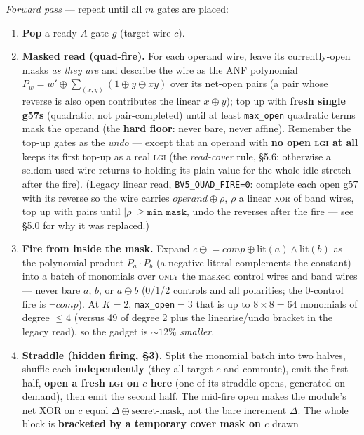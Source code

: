 \documentclass[11pt]{article}
\newcommand{\g}{\textsf{g57}}
\newcommand{\doc}[1]{\texttt{#1}}
\newcommand{\xor}{\oplus}
\newcommand{\lgi}{\textsc{lgi}}
\begin{document}
\emph{Forward pass} --- repeat until all $m$ gates are placed:
\begin{enumerate}
\item \textbf{Pop} a ready $A$-gate $g$ (target wire $c$).
\item \textbf{Masked read (quad-fire).} For each operand wire, leave its
  currently-open masks \emph{as they are} and describe the wire as the ANF
  polynomial $P_w = w' \xor \sum_{(x,y)} (1 \xor y \xor xy)$ over its net-open pairs
  (a pair whose reverse is also open contributes the linear $x \xor y$); top up with
  \textbf{fresh single \g s} (quadratic, not pair-completed) until at least
  \doc{max\_open} quadratic terms mask the operand (the \textbf{hard floor}: never
  bare, never affine). Remember the top-up gates as the \emph{undo} --- except that
  an operand with \textbf{no open \lgi{} at all} keeps its first top-up as a real
  \lgi{} (the \emph{read-cover} rule, \S5.6: otherwise a seldom-used wire returns to
  holding its plain value for the whole idle stretch after the fire). (Legacy linear
  read, \doc{BV5\_QUAD\_FIRE=0}: complete each open \g{} with its reverse so the wire
  carries $\mathit{operand} \xor \rho$, $\rho$ a linear \textsc{xor} of band wires,
  top up with pairs until $|\rho| \ge \doc{min\_mask}$, undo the reverses after the
  fire --- see \S5.0 for why it was replaced.)
\item \textbf{Fire from inside the mask.} Expand $c \mathrel{\xor}= \mathit{comp}
  \xor \mathrm{lit}(a)\land\mathrm{lit}(b)$ as the polynomial product $P_a \cdot P_b$
  (a negative literal complements the constant) into a batch of monomials over
  \textsc{only} the masked control wires and band wires --- never bare $a$, $b$, or
  $a\xor b$ (0/1/2 controls and all polarities; the 0-control fire is
  $\lnot\mathit{comp}$). At $K=2$, \doc{max\_open}$=3$ that is up to $8\times8=64$
  monomials of degree $\le 4$ (versus 49 of degree 2 plus the linearise/undo bracket
  in the legacy read), so the gadget is ${\sim}12\%$ \emph{smaller}.
\item \textbf{Straddle (hidden firing, \S3).} Split the monomial batch into two
  halves, shuffle each \textbf{independently} (they all target $c$ and commute),
  emit the first half, \textbf{open a fresh \lgi{} on $c$ here} (one of its straddle
  opens, generated on demand), then emit the second half. The mid-fire open makes
  the module's net XOR on $c$ equal $\Delta \xor \text{secret-mask}$, not the bare
  increment $\Delta$.
  The whole block is \textbf{bracketed by a temporary cover mask on $c$} drawn

\end{enumerate}
\end{document}
